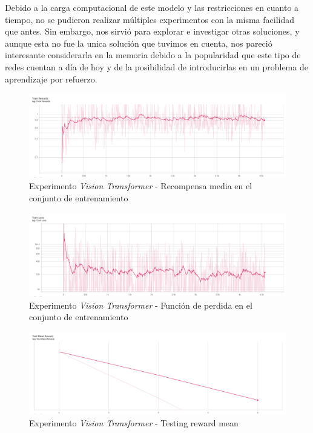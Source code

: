 Debido a la carga computacional de este modelo y las restricciones en cuanto a tiempo, no se pudieron realizar múltiples experimentos con la misma facilidad que antes. Sin embargo, nos sirvió para explorar e investigar otras soluciones, y aunque esta no fue la unica solución que tuvimos en cuenta, nos pareció interesante considerarla en la memoria debido a la popularidad que este tipo de redes cuentan a día de hoy y de la posibilidad de introducirlas en un problema de aprendizaje por refuerzo.
\medskip

\begin{figure}[H]
	\centering
	\includegraphics[width=1\textwidth]{figuras/experiments/vision transformers/train_rewards.png}
	\caption[Experimento \textit{Vision Transformer} - Recompensa media en el conjunto de entrenamiento]{Experimento \textit{Vision Transformer} - Recompensa media en el conjunto de entrenamiento}
	\label{fig-experimento-vision-transformer-1-training-reward-mean}
\end{figure}
\begin{figure}[H]
	\centering
	\includegraphics[width=1\textwidth]{figuras/experiments/vision transformers/train_loss.png}
	\caption[Experimento \textit{Vision Transformer} - Función de perdida en el conjunto de entrenamiento]{Experimento \textit{Vision Transformer} - Función de perdida en el conjunto de entrenamiento}
	\label{fig-experimento-vision-transformer-1-training-loss}
\end{figure}
\begin{figure}[H]
	\centering
	\includegraphics[width=1\textwidth]{figuras/experiments/vision transformers/test_mean_reward.png}
	\caption[Experimento \textit{Vision Transformer} - Testing reward mean]{Experimento \textit{Vision Transformer} - Testing reward mean}
	\label{fig-experimento-vision-transformer-1-testing-reward-mean}
\end{figure}
